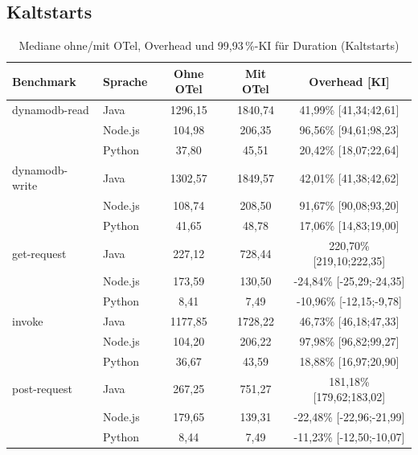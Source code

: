 \subsection{Kaltstarts}
\label{app:boot:cold}
\begin{table}[H]
\centering
\footnotesize
\caption{Mediane ohne/mit OTel, Overhead und 99,93\,\%-KI für Duration (Kaltstarts)}
\label{app:boot-abs-duration-cold}
\begin{tabular}{|l|l|c|c|c|}
\hline
\textbf{Benchmark} & \textbf{Sprache} & \textbf{Ohne OTel} & \textbf{Mit OTel} & \textbf{Overhead [KI]} \\
\hline
dynamodb-read   & Java    & 1296,15 & 1840,74 & 41,99\% [41,34;42,61] \\
                & Node.js &  104,98 &  206,35 & 96,56\% [94,61;98,23] \\
                & Python  &   37,80 &   45,51 & 20,42\% [18,07;22,64] \\
\hline
dynamodb-write  & Java    & 1302,57 & 1849,57 & 42,01\% [41,38;42,62] \\
                & Node.js &  108,74 &  208,50 & 91,67\% [90,08;93,20] \\
                & Python  &   41,65 &   48,78 & 17,06\% [14,83;19,00] \\
\hline
get-request     & Java    &  227,12 &  728,44 & 220,70\% [219,10;222,35] \\
                & Node.js &  173,59 &  130,50 & -24,84\% [-25,29;-24,35] \\
                & Python  &    8,41 &    7,49 & -10,96\% [-12,15;-9,78] \\
\hline
invoke          & Java    & 1177,85 & 1728,22 & 46,73\% [46,18;47,33] \\
                & Node.js &  104,20 &  206,22 & 97,98\% [96,82;99,27] \\
                & Python  &   36,67 &   43,59 & 18,88\% [16,97;20,90] \\
\hline
post-request    & Java    &  267,25 &  751,27 & 181,18\% [179,62;183,02] \\
                & Node.js &  179,65 &  139,31 & -22,48\% [-22,96;-21,99] \\
                & Python  &    8,44 &    7,49 & -11,23\% [-12,50;-10,07] \\
\hline
\end{tabular}
\end{table}


